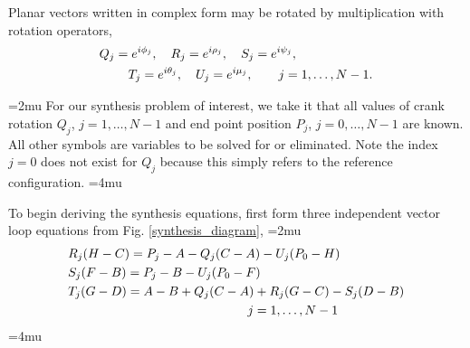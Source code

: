 \documentclass[journal]{IEEEtran}
\begin{document}
Planar vectors written in complex form may be rotated by multiplication with rotation operators,
\begin{align}
&Q_j = e^{i\phi_j}, \quad R_j = e^{i\rho_j}, \quad S_j = e^{i\psi_j}, \nonumber\\
&\hspace{8mm} T_j = e^{i\theta_j}, \quad U_j = e^{i\mu_j}, \qquad j=1,\ldots,N-1.
\end{align}

\medmuskip=2mu
For our synthesis problem of interest, we take it that all values of crank rotation $Q_j$, $j=1,\ldots,N-1$ and end point position $P_j$, $j=0,\ldots,N-1$ are known.  All other symbols are variables to be solved for or eliminated.  Note the index $j=0$ does not exist for $Q_j$ because this simply refers to the reference configuration.
\medmuskip=4mu

To begin deriving the synthesis equations, first form three independent vector loop equations from Fig. \ref{synthesis_diagram},
\medmuskip=2mu
\begin{align}
&R_j(H-C) = P_j - A - Q_j(C-A) - U_j(P_0-H) \label{loopR1}\\
&S_j(F-B) = P_j - B - U_j(P_0-F) \label{loopS1}\\
&T_j(G-D) = A-B + Q_j(C-A) + R_j(G-C) - S_j(D-B) \label{loopT1}\\
&\hspace{50mm} j=1,\ldots,N-1 \nonumber
\end{align}
\medmuskip=4mu
\end{document}
